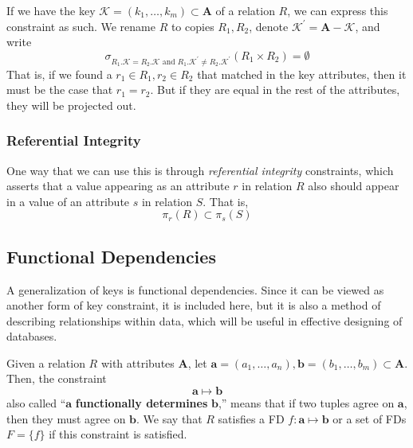     \begin{definition}
      \label{def:key-constraints}
      If we have the key $\mathcal{K} = (k_1, \ldots, k_m) \subset \mathbf{A}$ of a relation $R$, we can express this constraint as such. We rename $R$ to copies $R_1, R_2$, denote $\mathcal{K}^\prime = \mathbf{A} - \mathcal{K}$, and write 
      \begin{equation}
        \sigma_{R_1.\mathcal{K} = R_2.\mathcal{K} \text{ and } R_1.\mathcal{K}^\prime \neq R_2.\mathcal{K}^\prime} (R_1 \times R_2) = \emptyset
      \end{equation}
      That is, if we found a $r_1 \in R_1, r_2 \in R_2$ that matched in the key attributes, then it must be the case that $r_1 = r_2$. But if they are equal in the rest of the attributes, they will be projected out. 
    \end{definition}

  \subsubsection{Referential Integrity}

    \begin{definition}
      \label{def:referential-integrity-constraints}
      One way that we can use this is through \textit{referential integrity} constraints, which asserts that a value appearing as an attribute $r$ in relation $R$ also should appear in a value of an attribute $s$ in relation $S$. That is, 
      \begin{equation}
        \pi_r (R) \subset \pi_s (S)
      \end{equation}
    \end{definition}

\subsection{Functional Dependencies} 

    A generalization of keys is functional dependencies. Since it can be viewed as another form of key constraint, it is included here, but it is also a method of describing relationships within data, which will be useful in effective designing of databases.  

    \begin{definition}
      \label{def:functional-dependency}
      Given a relation $R$ with attributes $\mathbf{A}$, let $\mathbf{a} = (a_1, \ldots, a_n), \mathbf{b} = (b_1, \ldots, b_m) \subset \mathbf{A}$. Then, the constraint 
      \begin{equation}
        \mathbf{a} \mapsto \mathbf{b}
      \end{equation}
      also called ``$\mathbf{a}$ \textbf{functionally determines} $\mathbf{b}$,'' means that if two tuples agree on $\mathbf{a}$, then they must agree on $\mathbf{b}$. We say that $R$ satisfies a FD $f: \mathbf{a} \mapsto \mathbf{b}$ or a set of FDs $F = \{f\}$ if this constraint is satisfied. 
    \end{definition}

